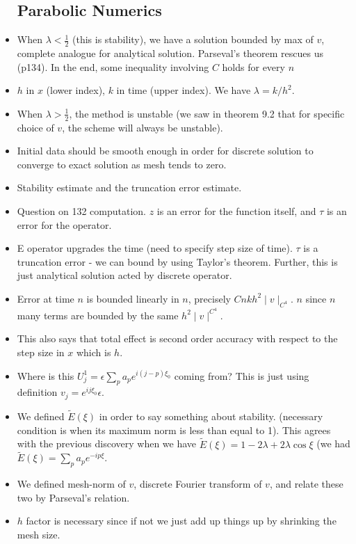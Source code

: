 \documentclass{article}
\theoremstyle{remark}
\begin{document}
\begin{itemize}
\subsection*{Parabolic Numerics}
\item When $\lambda<\frac 12$ (this is stability), we have a solution bounded by max of $v$, complete analogue for analytical solution. Parseval's theorem rescues us (p134). In the end, some inequality involving $C$ holds for every $n$
\item $h$ in $x$ (lower index), $k$ in time (upper index). We have $\lambda=k/h^2$.
\item When $\lambda>\frac 12$, the method is unstable (we saw in theorem 9.2 that for specific choice of $v$, the scheme will always be unstable).
\item Initial data should be smooth enough in order for discrete solution to converge to exact solution as mesh tends to zero.
\item Stability estimate and the truncation error estimate.
\item Question on 132 computation. $z$ is an error for the function itself, and $\tau$ is an error for the operator.
\item E operator upgrades the time (need to specify step size of time). $\tau$ is a truncation error - we can bound by using Taylor's theorem. Further, this is just analytical solution acted by discrete operator.
\item Error at time $n$ is bounded linearly in $n$, precisely $Cnkh^2\mid v\mid_{C^4}$. $n$ since $n$ many terms are bounded by the same $h^2\mid v\mid^{C^4}$.
\item This also says that total effect is second order accuracy with respect to the step size in $x$ which is $h$.
\item Where is this $U^1_j=\epsilon\sum_p a_pe^{i(j-p)\xi_0}$ coming from? This is just using definition $v_j=e^{ij\xi_0}\epsilon$.
\item We defined $\tilde E(\xi)$ in order to say something about stability. (necessary condition is when its maximum norm is less than equal to 1). This agrees with the previous discovery when we have $\tilde E(\xi)=1-2\lambda+2\lambda\cos \xi$ (we had $\tilde E(\xi)=\sum_p a_pe^{-ip\xi}$.
\item We defined mesh-norm of $v$, discrete Fourier transform of $v$, and relate these two by Parseval's relation. 
\item $h$ factor is necessary since if not we just add up things up by shrinking the mesh size.

\end{itemize}
\end{document}

